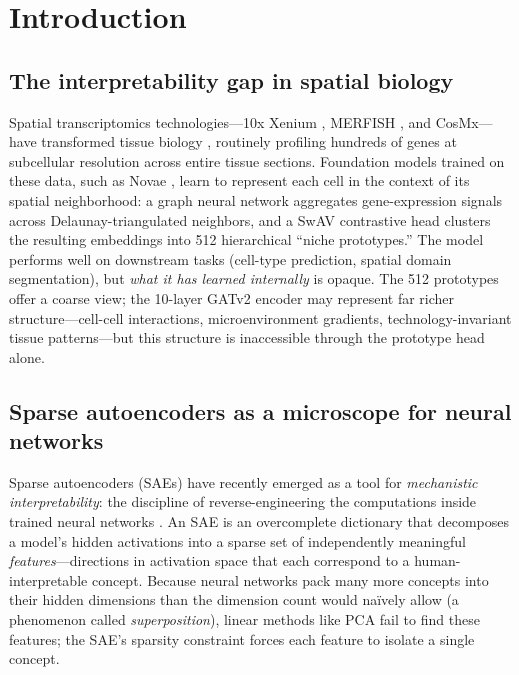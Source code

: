 \documentclass[11pt]{article}
\begin{document}
\section{Introduction}

\subsection{The interpretability gap in spatial biology}

Spatial transcriptomics technologies---10x Xenium \citep{xenium},
MERFISH \citep{merfish}, and CosMx---have transformed tissue biology
\citep{marx2021,moses2022,rao2021}, routinely profiling hundreds
of genes at subcellular resolution across entire tissue sections.
Foundation models trained on these data, such as Novae
\citep{novae}, learn to represent each cell in the context of its
spatial neighborhood: a graph neural network \citep{kipf2017,velickovic2018,li2022gnn}
aggregates gene-expression signals across Delaunay-triangulated
neighbors, and a SwAV \citep{swav} contrastive head clusters the resulting embeddings into
512 hierarchical ``niche prototypes.'' The model performs well on
downstream tasks (cell-type prediction, spatial domain segmentation),
but \emph{what it has learned internally} is opaque. The 512
prototypes offer a coarse view; the 10-layer GATv2 \citep{gatv2}
encoder may represent far richer structure---cell-cell interactions,
microenvironment gradients, technology-invariant tissue patterns---but
this structure is inaccessible through the prototype head alone.

\subsection{Sparse autoencoders as a microscope for neural networks}

Sparse autoencoders (SAEs) have recently emerged as a tool for
\emph{mechanistic interpretability}: the discipline of reverse-engineering
the computations inside trained neural networks
\citep{olah2020,elhage2021,elhage2022superposition,cunningham2023,bricken2023}. An SAE is
an overcomplete dictionary that decomposes a model's hidden activations
into a sparse set of independently meaningful \emph{features}---directions
in activation space that each correspond to a human-interpretable concept.
Because neural networks pack many more concepts into their hidden
dimensions than the dimension count would na\"ively allow (a phenomenon
called \emph{superposition}), linear methods like PCA fail to find these
features; the SAE's sparsity constraint forces each feature to isolate a
single concept.
\end{document}
